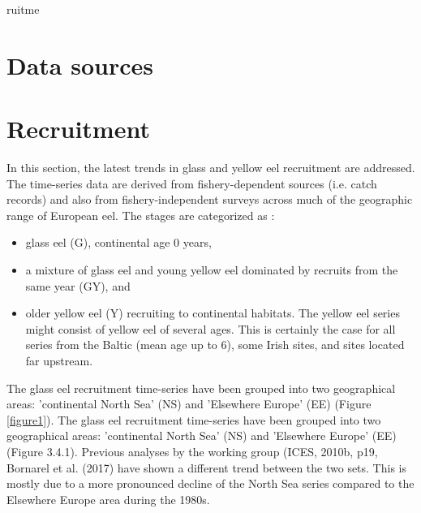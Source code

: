 ruitme\documentclass[pdftex,11pt,a4paper]{report}
\begin{document}



\section{Data sources}
\section{Recruitment}

In this section, the latest trends in glass and yellow eel recruitment are
addressed. The time-series data are derived from fishery-dependent sources
(i.e. catch records) and also from fishery-independent surveys across much of
the geographic range of European eel.  The
stages are categorized as :
\begin{itemize}
\item glass eel (G), continental age 0 years, 
\item a mixture of glass eel and young
yellow eel dominated by recruits from the same year (GY), and
\item older yellow eel (Y) recruiting to continental habitats. The yellow
eel series might consist of yellow eel of several ages.
This is certainly the case for all series from the Baltic (mean age up to 6),
 some Irish sites, and sites located far upstream.
\end{itemize}
The glass eel recruitment time-series have been grouped into two geographical
areas: 'continental North Sea' (NS) and 'Elsewhere Europe' (EE) (Figure
\ref{figure1}). The glass eel recruitment time-series have been grouped into two geographical
areas: 'continental North Sea' (NS) and 'Elsewhere Europe' (EE) (Figure 3.4.1).
Previous analyses by the working group (ICES, 2010b, p19, Bornarel et al. (2017) 
have shown a different trend between the two sets. This is mostly due to a more pronounced
decline of the North Sea series compared to the Elsewhere Europe area during the 1980s.
\end{document}
